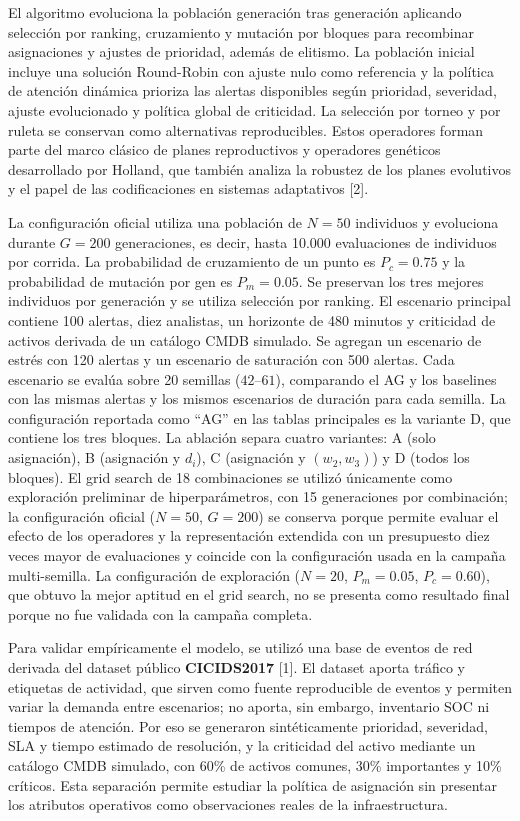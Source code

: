 \documentclass[12pt,a4paper,twocolumn]{article}
\begin{document}
El algoritmo evoluciona la población generación tras generación aplicando selección por ranking, cruzamiento y mutación por bloques para recombinar asignaciones y ajustes de prioridad, además de elitismo. La población inicial incluye una solución Round-Robin con ajuste nulo como referencia y la política de atención dinámica prioriza las alertas disponibles según prioridad, severidad, ajuste evolucionado y política global de criticidad. La selección por torneo y por ruleta se conservan como alternativas reproducibles. Estos operadores forman parte del marco clásico de planes reproductivos y operadores genéticos desarrollado por Holland, que también analiza la robustez de los planes evolutivos y el papel de las codificaciones en sistemas adaptativos [2].

La configuración oficial utiliza una población de $N=50$ individuos y evoluciona durante $G=200$ generaciones, es decir, hasta 10.000 evaluaciones de individuos por corrida. La probabilidad de cruzamiento de un punto es $P_c=0.75$ y la probabilidad de mutación por gen es $P_m=0.05$. Se preservan los tres mejores individuos por generación y se utiliza selección por ranking. El escenario principal contiene 100 alertas, diez analistas, un horizonte de 480 minutos y criticidad de activos derivada de un catálogo CMDB simulado. Se agregan un escenario de estrés con 120 alertas y un escenario de saturación con 500 alertas. Cada escenario se evalúa sobre 20 semillas ($42$--$61$), comparando el AG y los baselines con las mismas alertas y los mismos escenarios de duración para cada semilla. La configuración reportada como ``AG'' en las tablas principales es la variante D, que contiene los tres bloques. La ablación separa cuatro variantes: A (solo asignación), B (asignación y $d_i$), C (asignación y $(w_2,w_3)$) y D (todos los bloques). El grid search de 18 combinaciones se utilizó únicamente como exploración preliminar de hiperparámetros, con 15 generaciones por combinación; la configuración oficial ($N=50$, $G=200$) se conserva porque permite evaluar el efecto de los operadores y la representación extendida con un presupuesto diez veces mayor de evaluaciones y coincide con la configuración usada en la campaña multi-semilla. La configuración de exploración ($N=20$, $P_m=0.05$, $P_c=0.60$), que obtuvo la mejor aptitud en el grid search, no se presenta como resultado final porque no fue validada con la campaña completa.

Para validar empíricamente el modelo, se utilizó una base de eventos de red derivada del dataset público \textbf{CICIDS2017} [1]. El dataset aporta tráfico y etiquetas de actividad, que sirven como fuente reproducible de eventos y permiten variar la demanda entre escenarios; no aporta, sin embargo, inventario SOC ni tiempos de atención. Por eso se generaron sintéticamente prioridad, severidad, SLA y tiempo estimado de resolución, y la criticidad del activo mediante un catálogo CMDB simulado, con 60\% de activos comunes, 30\% importantes y 10\% críticos. Esta separación permite estudiar la política de asignación sin presentar los atributos operativos como observaciones reales de la infraestructura.
\end{document}
